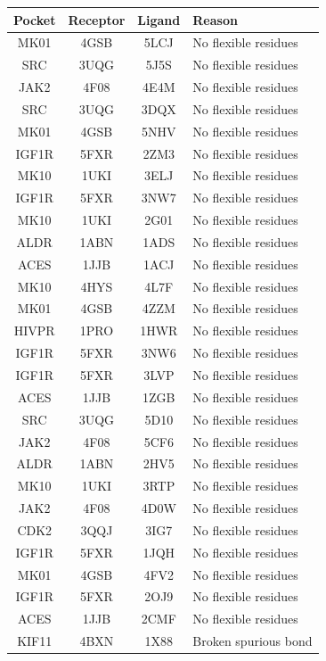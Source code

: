 \documentclass[journal=jcisd8,manuscript=article]{achemso}
\begin{document}
\begin{table}[]
    \centering
    \begin{tabular}{c c c l}
\toprule
Pocket & Receptor & Ligand & Reason \\
\midrule
MK01 & 4GSB & 5LCJ & No flexible residues \\
SRC & 3UQG & 5J5S & No flexible residues \\
JAK2 & 4F08 & 4E4M & No flexible residues \\
SRC & 3UQG & 3DQX & No flexible residues \\
MK01 & 4GSB & 5NHV & No flexible residues \\
IGF1R & 5FXR & 2ZM3 & No flexible residues \\
MK10 & 1UKI & 3ELJ & No flexible residues \\
IGF1R & 5FXR & 3NW7 & No flexible residues \\
MK10 & 1UKI & 2G01 & No flexible residues \\
ALDR & 1ABN & 1ADS & No flexible residues \\
ACES & 1JJB & 1ACJ & No flexible residues \\
MK10 & 4HYS & 4L7F & No flexible residues \\
MK01 & 4GSB & 4ZZM & No flexible residues \\
HIVPR & 1PRO & 1HWR & No flexible residues \\
IGF1R & 5FXR & 3NW6 & No flexible residues \\
IGF1R & 5FXR & 3LVP & No flexible residues \\
ACES & 1JJB & 1ZGB & No flexible residues \\
SRC & 3UQG & 5D10 & No flexible residues \\
JAK2 & 4F08 & 5CF6 & No flexible residues \\
ALDR & 1ABN & 2HV5 & No flexible residues \\
MK10 & 1UKI & 3RTP & No flexible residues \\
JAK2 & 4F08 & 4D0W & No flexible residues \\
CDK2 & 3QQJ & 3IG7 & No flexible residues \\
IGF1R & 5FXR & 1JQH & No flexible residues \\
MK01 & 4GSB & 4FV2 & No flexible residues \\
IGF1R & 5FXR & 2OJ9 & No flexible residues \\
ACES & 1JJB & 2CMF & No flexible residues \\
KIF11 & 4BXN & 1X88 & Broken spurious bond \\

\end{tabular}
\end{table}
\end{document}
